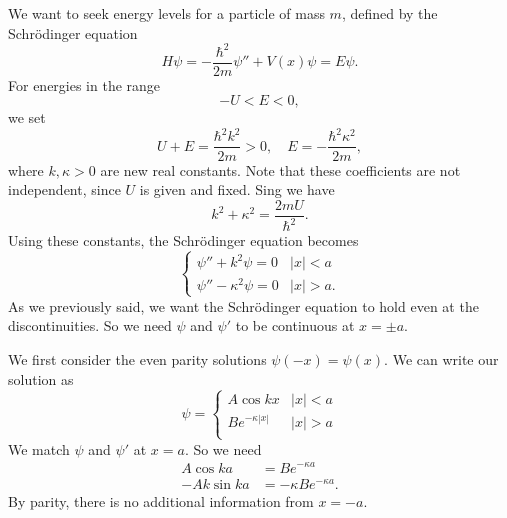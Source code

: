 \documentclass[a4paper]{article}
\begin{document}
We want to seek energy levels for a particle of mass $m$, defined by the Schr\"odinger equation
\[
  H\psi = -\frac{\hbar^2}{2m}\psi'' + V(x) \psi = E\psi.
\]
For energies in the range
\[
  -U < E < 0,
\]
we set
\[
  U + E = \frac{\hbar^2 k^2}{2m} > 0,\quad E = -\frac{\hbar^2 \kappa^2}{2m},
\]
where $k, \kappa > 0$ are new real constants. Note that these coefficients are not independent, since $U$ is given and fixed. Sing we have
\[
  k^2 + \kappa^2 = \frac{2mU}{\hbar^2}.
\]
Using these constants, the Schr\"odinger equation becomes
\[
  \begin{cases}
    \psi'' + k^2 \psi = 0 & |x| < a\\
    \psi'' - \kappa^2 \psi = 0 & |x| > a.
  \end{cases}
\]
As we previously said, we want the Schr\"odinger equation to hold even at the discontinuities. So we need $\psi$ and $\psi'$ to be continuous at $x = \pm a$.

We first consider the even parity solutions $\psi(-x) = \psi(x)$. We can write our solution as
\[
  \psi =
  \begin{cases}
    A \cos kx & |x| < a\\
    B e^{-\kappa |x|}  & |x| > a\\
  \end{cases}
\]
We match $\psi$ and $\psi'$ at $x = a$. So we need
\begin{align*}
  A\cos ka &= Be^{-\kappa a}\\
  -Ak\sin ka &= -\kappa Be^{-\kappa a}.
\end{align*}
By parity, there is no additional information from $x = -a$.
\end{document}
